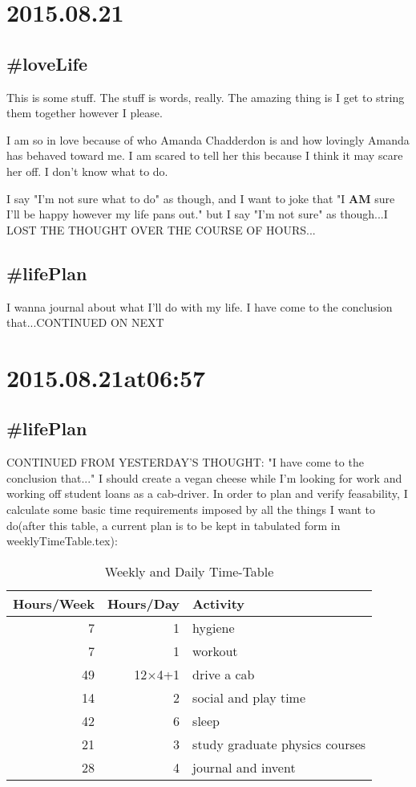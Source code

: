 \section*{2015.08.21}
\subsection*{#loveLife}
This is some stuff. The stuff is words, really. The amazing thing is I get to string them together however I please.

I am so in love because of who Amanda Chadderdon is and how lovingly Amanda has behaved toward me. I am scared to tell her this because I think it may scare her off. I don't know what to do.

I say "I'm not sure what to do" as though, and I want to joke that "I \textbf{AM} sure I'll be happy however my life pans out." but I say "I'm not sure" as though...I LOST THE THOUGHT OVER THE COURSE OF HOURS...

\subsection*{#lifePlan}
I wanna journal about what I'll do with my life. I have come to the conclusion that...CONTINUED ON NEXT

\section*{2015.08.21at06:57}
\subsection*{#lifePlan} CONTINUED FROM YESTERDAY'S THOUGHT:
"I have come to the conclusion that..." I should create a vegan cheese while I'm looking for work and working off student loans as a cab-driver. In order to plan and verify feasability, I calculate some basic time requirements imposed by all the things I want to do(after this table, a current plan is to be kept in tabulated form in weeklyTimeTable.tex):

\begin{table}
\caption{\label{tab:originalWeeklyAndDailyTimeTable}Weekly and Daily Time-Table}
\begin{tabular}{|r|r|l|}
\hline Hours/Week&Hours/Day&Activity\\\hline
7&1&hygiene\\
7&1&workout\\
49&12$\times$4+1&drive a cab\\
14&2&social and play time\\
42&6&sleep\\
21&3&study graduate physics courses\\
28&4&journal and invent\\\hline
\end{tabular}\end{table}

